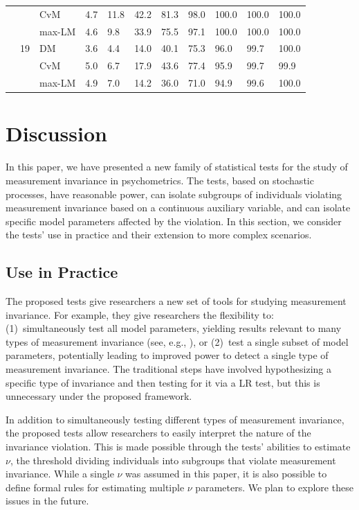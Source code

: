 \documentclass[man]{apa}
\begin{document}
\begin{table}
\begin{center}
\begin{tabular}{lllllllllll}
         &         &  CvM            &  4.7 &   11.8 &   42.2 &   81.3 &   98.0 &  100.0  & 100.0 &  100.0 \\ 
         &         &  max-LM          &  4.6 &    9.8 &   33.9 &   75.5 &   97.1 &  100.0  & 100.0 &  100.0 \\ 
         &  19   &  DM           &  3.6 &    4.4 &   14.0 &   40.1 &   75.3 &   96.0  &  99.7 &  100.0 \\ 
         &         &  CvM            &  5.0 &    6.7 &   17.9 &   43.6 &   77.4 &   95.9  &  99.7 &   99.9 \\ 
         &         &  max-LM          &  4.9 &    7.0 &   14.2 &   36.0 &   71.0 &   94.9  &  99.6 &  100.0 \\ 
   \hline
\end{tabular}
\end{center}
\end{table}


\section{Discussion}
In this paper, we have presented a new family of statistical tests for
the study of measurement invariance in psychometrics.  The tests,
based on stochastic processes, have reasonable power, can isolate
subgroups of individuals violating measurement invariance based on a
continuous auxiliary variable, and can
isolate specific model parameters affected by the violation.  In this
section, we consider the tests' use in practice and their 
extension to more complex scenarios.

\subsection{Use in Practice}
The proposed tests give researchers a new set of tools for studying 
measurement invariance.  For example, they give researchers the
flexibility to: (1)~simultaneously test all model parameters, yielding
results relevant to many types of measurement
invariance (see, e.g., ), or (2)~test a single subset of
model parameters, potentially leading to improved power to detect a
single type of measurement invariance.  The traditional
steps have involved hypothesizing a specific type of invariance and
then testing for it via a LR test, but this is
unnecessary under the proposed framework.

In addition to simultaneously testing different types of measurement
invariance, the proposed tests allow researchers to easily interpret
the nature of the invariance violation.  This is made possible through
the tests' abilities to estimate $\nu$, the threshold dividing
individuals into subgroups that violate
measurement invariance.  While a single $\nu$ was assumed in this
paper, it is also possible to define 
formal rules for estimating multiple $\nu$ parameters.  We plan to
explore these issues in the future.
\end{document}
